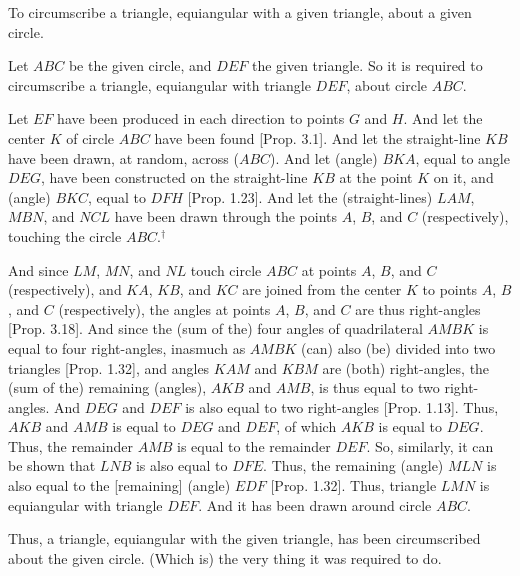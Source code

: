 \begin{Parallel}{}{}
{To circumscribe a triangle, equiangular with a given triangle, about a given
circle.

\epsfysize=1.8in
\centerline{}

Let $ABC$ be the given circle, and $DEF$ the given triangle. So it is required
to circumscribe a triangle, equiangular with triangle  $DEF$, about circle $ABC$.

Let $EF$ have been produced in each direction to points $G$ and 
$H$. And
let the center $K$ of circle $ABC$ have been found [Prop. 3.1].
And let the straight-line $KB$ have been drawn, at random,  across ($ABC$).
And let (angle) $BKA$, equal to angle $DEG$, have been constructed on the straight-line $KB$ at the point $K$ on it, and (angle) $BKC$, equal to
$DFH$ [Prop. 1.23]. And let the (straight-lines) $LAM$, $MBN$, and $NCL$ have been 
drawn through the points $A$, $B$, and $C$ (respectively), touching the circle $ABC$.$^\dag$

And since $LM$, $MN$, and $NL$ touch circle $ABC$ at points $A$, $B$, and $C$
(respectively), and $KA$, $KB$, and $KC$ are joined from the center $K$
to  points $A$, $B$, and $C$ (respectively), the angles at points
$A$, $B$, and $C$ are thus right-angles [Prop. 3.18]. And
since the (sum of the) four angles of quadrilateral $AMBK$ is equal to
four right-angles,
inasmuch as $AMBK$ (can) also (be) divided into two triangles [Prop. 1.32],
and angles $KAM$ and $KBM$ are (both) right-angles, the (sum of the) remaining (angles), $AKB$ and $AMB$, is thus equal to two right-angles. 
And $DEG$ and $DEF$ is also equal to two right-angles [Prop. 1.13].
Thus, $AKB$ and $AMB$ is equal to $DEG$ and $DEF$, of which $AKB$ is
equal to $DEG$. Thus, the remainder $AMB$ is equal to the remainder $DEF$.
So, similarly, it can be shown that $LNB$ is also equal to $DFE$. Thus, the
remaining (angle) $MLN$ is also equal to the [remaining] (angle) $EDF$ [Prop. 1.32]. Thus,
triangle $LMN$ is equiangular with triangle $DEF$. And it has been drawn around
circle $ABC$.

Thus,  a triangle, equiangular with  the given triangle, has been circumscribed about the given
circle. (Which is) the very thing it was required to do.}
\end{Parallel}


\vspace{7pt}{\footnotesize \noindent$^\dag$ See the footnote
to Prop.~3.34.}

